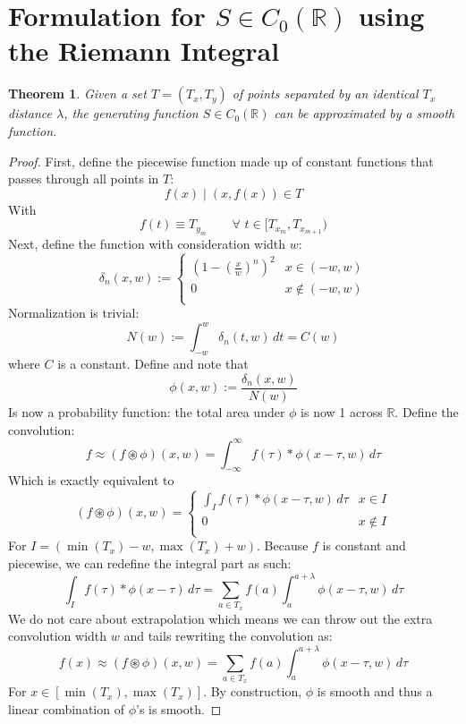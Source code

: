 \documentclass[11pt]{amsart}
\newtheorem{thm}{Theorem}[section]
\theoremstyle{definition}
\theoremstyle{remark}
\begin{document}
\section{Formulation for $S\in C_0(\mathbb{R})$ using the Riemann Integral}
\begin{thm}Given a set $T=(T_x, T_y)$ of points separated by an identical $T_x$ distance $\lambda$, the generating function $S\in C_0(\mathbb{R})$ can be approximated by a smooth function.
\end{thm}
\begin{proof}
First, define the piecewise function made up of constant functions that passes through all points in $T$:
$$
f(x)\mid (x,f(x))\in T
$$
With
$$
f(t)\equiv T_{y_m} \qquad\forall\,\, t\in [T_{x_m}, T_{x_{m+1}})
$$
Next, define the function with consideration width $w$:
\begin{equation}
\delta_n(x, w):=
\begin{cases}
\left(1-\left(\frac{x}{w}\right)^n\right)^2 & x\in (-w, w)\\
0&x\not\in (-w, w)\\
\end{cases}
\end{equation}
Normalization is trivial:
$$
N(w):=\int_{-w}^w\delta_n(t, w)\,dt =C(w)
$$where $C$ is a constant. Define and note that 
\begin{equation}
\phi(x,w) := \frac{\delta_n(x,w)}{N(w)}
\end{equation}
Is now a probability function: the total area under $\phi$ is now 1 across $\mathbb{R}$. Define the convolution:
$$
f\approx(f\circledast\phi)(x, w) = \int_{-\infty}^\infty f(\tau)*\phi(x-\tau, w)\,d\tau
$$
Which is exactly equivalent to
\begin{equation}
(f\circledast\phi)(x, w) =
\begin{cases}
\displaystyle \int_I f(\tau)*\phi(x-\tau, w)\,d\tau &x\in I\\
0 &x\not\in I\\
\end{cases}
\end{equation}
For $I=(\min(T_x)-w,\max(T_x)+w)$. Because $f$ is constant and piecewise, we can redefine the integral part as such:
\begin{equation}
\displaystyle \int_I f(\tau)*\phi(x-\tau)\,d\tau = \displaystyle\sum_{a\in T_x} f(a) \int_a^{a+\lambda} \phi(x-\tau, w)\,d\tau
\end{equation}
We do not care about extrapolation which means we can throw out the extra convolution width $w$ and tails rewriting the convolution as:
$$
f(x)\approx(f\circledast\phi)(x, w) =\displaystyle\sum_{a\in T_x} f(a)\displaystyle\int_a^{a+\lambda} \phi(x-\tau, w)\,d\tau
$$
For $x\in [\min(T_x),\max(T_x)]$. By construction, $\phi$ is smooth and thus a linear combination of $\phi$'s is smooth.
\end{proof}
\end{document}
